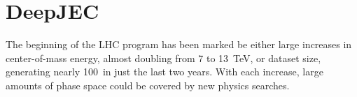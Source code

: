 \chapter{DeepJEC}

The beginning of the LHC program has been marked be either large increases in center-of-mass energy, almost doubling from 7 to 13~TeV, or dataset size, generating nearly 100~\ifb in just the last two years.
With each increase, large amounts of phase space could be covered by new physics searches.


